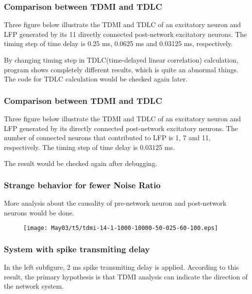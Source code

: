 \documentclass{beamer}
\begin{document}
\begin{frame}
  \frametitle{Comparison between TDMI and TDLC}
  \scriptsize{Three figure below illustrate the TDMI and TDLC of an excitatory neuron and LFP generated by its 11 directly connected post-network excitatory neurons. The timing step of time delay is 0.25 ms, 0.0625 ms and 0.03125 ms, respectively.}
  \begin{figure}[h]
    \centering
  \end{figure}
  \small{By changing timing step in TDLC(time-delayed linear correlation) calculation, program shows completely different results, which is quite an abnormal things. The code for TDLC calculation would be checked again later.}
\end{frame}

\begin{frame}
  \frametitle{Comparison between TDMI and TDLC}
  \scriptsize{Three figure below illustrate the TDMI and TDLC of an excitatory neuron and LFP generated by its directly connected post-network excitatory neurons. The number of connected neurons that contributed to LFP is 1, 7 and 11, respectively. The timing step of time delay is 0.03125 ms.}
  \begin{figure}[h]
    \centering
  \end{figure}
  \small{The result would be checked again after debugging.}
\end{frame}

\begin{frame}
  \frametitle{Strange behavior for fewer Noise Ratio}
  \scriptsize{More analysis about the causality of pre-network neuron and post-network neurons would be done.}
  \begin{figure}[h]
    \centering
    \texttt{[image: May03/t5/tdmi-14-1-1000-10000-50-025-60-100.eps]}
  \end{figure}
\end{frame}

\begin{frame}
  \frametitle{System with spike transmiting delay}
  \begin{figure}[h]
    \centering
  \end{figure}
  \scriptsize{In the left subfigure, 2 ms spike transmiting delay is applied. According to this result, the primary hypothesis is that TDMI analysis can indicate the direction of the network system.}
\end{frame}
\end{document}
